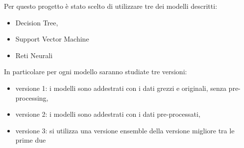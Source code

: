 Per questo progetto è stato scelto di utilizzare tre dei modelli descritti:
\begin{itemize}
\item Decision Tree,
\item Support Vector Machine
\item Reti Neurali
\end{itemize}

In particolare per ogni modello saranno studiate tre versioni:
\begin{itemize}
\item versione 1: i modelli sono addestrati con i dati grezzi e originali, senza pre-processing,
\item versione 2: i modelli sono addestrati con i dati pre-processati,
\item versione 3: si utilizza una versione ensemble della versione migliore tra le prime due
\end{itemize}